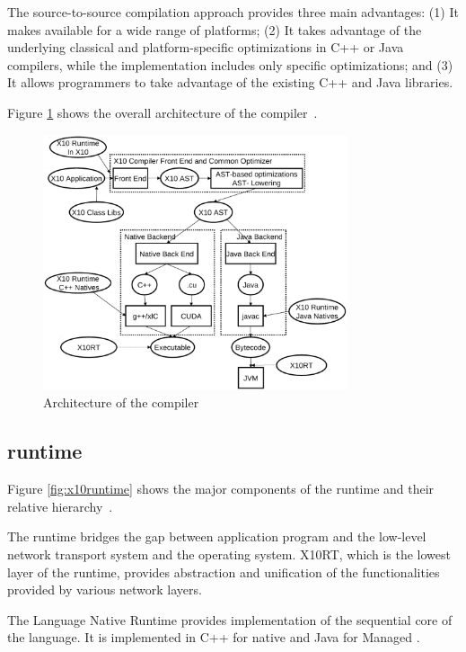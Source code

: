 The
source-to-source compilation approach provides 
three main advantages: (1) It makes \xten
available for a wide range of platforms; (2) It takes advantage of the
underlying classical and platform-specific optimizations in C++ or Java
compilers, while the \xten implementation includes only \xten specific
optimizations; and (3) It allows programmers to take advantage of the existing
C++ and Java libraries.

Figure \ref{fig:x10compiler} shows the overall architecture of the \xten
compiler~\cite{}.  
 
\begin{figure}[p]
    \centering
    \includegraphics[width=0.8\textwidth]{Figures/x10compiler.eps}
    \caption{Architecture of the \xten compiler}
    \label{fig:x10compiler}
\end{figure}

\subsection{\xten runtime}
Figure \ref{fig:x10runtime} shows the major components of the \xten runtime and
their relative hierarchy~\cite{}. 

The runtime bridges the gap between 
application program and
the low-level network transport system and the operating system. X10RT, which is
the lowest layer of the \xten runtime, provides abstraction and unification of
the functionalities provided by various network layers. 

The \xten Language
Native Runtime provides implementation of the sequential core of the language.
It is implemented in C++ for native \xten and Java for Managed \xten. 

